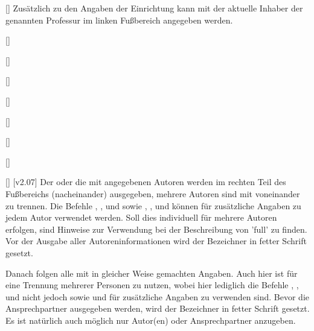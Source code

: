 \begin{DeclareEntity}{}
\begin{Declaration}
  {[]}
\printdeclarationlist
%
Zusätzlich zu den Angaben der Einrichtung kann mit  der 
aktuelle Inhaber der genannten Professur im linken Fußbereich angegeben werden.
\end{Declaration}

\begin{Declaration}
  {[]}
\begin{Declaration}
  {[]}
\begin{Declaration}
  {[]}
\begin{Declaration}
  {[]}
\begin{Declaration}
  {[]}
\begin{Declaration}
  {[]}
\begin{Declaration}
  {[]}
\begin{Declaration}
  {[]}
\printdeclarationlist
%
[v2.07]
Der oder die mit  angegebenen Autoren werden im rechten Teil des 
Fußbereichs (nacheinander) ausgegeben, mehrere Autoren sind mit  
voneinander zu trennen. Die Befehle , , 
 und  sowie , , 
und  können für zusätzliche Angaben zu jedem Autor verwendet 
werden. Soll dies individuell für mehrere Autoren erfolgen, sind Hinweise zur 
Verwendung bei der Beschreibung von 'full' zu finden. Vor der 
Ausgabe aller Autoreninformationen wird der Bezeichner  in 
fetter Schrift gesetzt. 

Danach folgen alle mit  in gleicher Weise gemachten 
Angaben. Auch hier ist  für eine Trennung mehrerer Personen zu 
nutzen, wobei hier lediglich die Befehle , , 
 und  nicht jedoch  sowie 
 und  für zusätzliche Angaben zu verwenden 
sind. Bevor die Ansprechpartner ausgegeben werden, wird der Bezeichner 
 in fetter Schrift gesetzt. Es ist natürlich auch 
möglich nur Autor(en) oder Ansprechpartner anzugeben.
\end{Declaration}
\end{Declaration}
\end{Declaration}
\end{Declaration}
\end{Declaration}
\end{Declaration}
\end{Declaration}
\end{Declaration}


\end{DeclareEntity}
